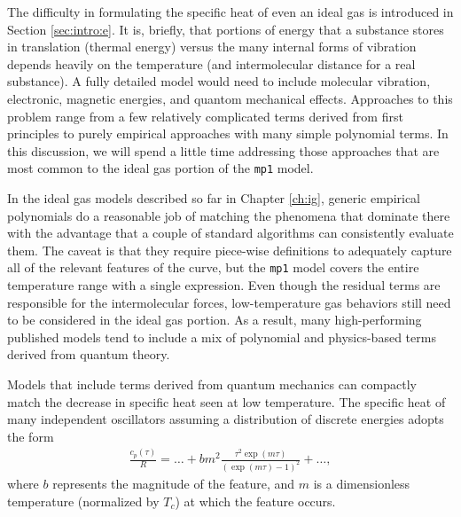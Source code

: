 The difficulty in formulating the specific heat of even an ideal gas is introduced in Section \ref{sec:intro:e}.  It is, briefly, that portions of energy that a substance stores in translation (thermal energy) versus the many internal forms of vibration depends heavily on the temperature (and intermolecular distance for a real substance).  A fully detailed model would need to include molecular vibration, electronic, magnetic energies, and quantom mechanical effects.  Approaches to this problem range from a few relatively complicated terms derived from first principles to purely empirical approaches with many simple polynomial terms.  In this discussion, we will spend a little time addressing those approaches that are most common to the ideal gas portion of the \verb|mp1| model.

In the ideal gas models described so far in Chapter \ref{ch:ig}, generic empirical polynomials do a reasonable job of matching the phenomena that dominate there with the advantage that a couple of standard algorithms can consistently evaluate them.  The caveat is that they require piece-wise definitions to adequately capture all of the relevant features of the curve, but the \verb|mp1| model covers the entire temperature range with a single expression.  Even though the residual terms are responsible for the intermolecular forces, low-temperature gas behaviors still need to be considered in the ideal gas portion.  As a result, many high-performing published models tend to include a mix of polynomial and physics-based terms derived from quantum theory.

Models that include terms derived from quantum mechanics can compactly match the decrease in specific heat seen at low temperature.  The specific heat of many independent oscillators assuming a distribution of discrete energies adopts the form
\begin{align}
\frac{c_p(\tau)}{R} = \ldots + b m^2 \frac{\tau^2 \exp(m\tau)}{\left(\exp(m\tau) - 1\right)^2} + \ldots\nonumber,
\end{align}
where $b$ represents the magnitude of the feature, and $m$ is a dimensionless temperature (normalized by $T_c$) at which the feature occurs.

